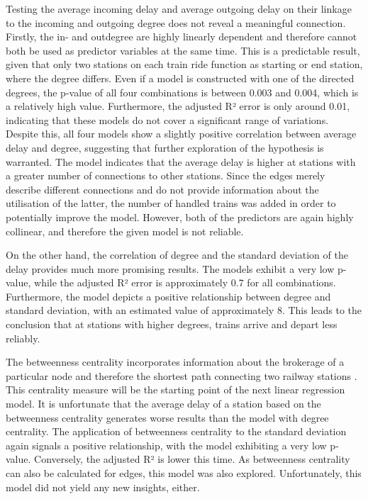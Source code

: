 \documentclass[12pt,a4paper]{article}
\begin{document}
Testing the average incoming delay and average outgoing delay on their linkage to the incoming and outgoing degree does not reveal a meaningful connection. Firstly, the in- and outdegree are highly linearly dependent and therefore cannot both be used as predictor variables at the same time. This is a predictable result, given that only two stations on each train ride function as starting or end station, where the degree differs. Even if a model is constructed with one of the directed degrees, the p-value of all four combinations is between 0.003 and 0.004, which is a relatively high value. Furthermore, the adjusted R² error is only around 0.01, indicating that these models do not cover a significant range of variations. Despite this, all four models show a slightly positive correlation between average delay and degree, suggesting that further exploration of the hypothesis is warranted. The model indicates that the average delay is higher at stations with a greater number of connections to other stations. Since the edges merely describe different connections and do not provide information about the utilisation of the latter, the number of handled trains was added in order to potentially improve the model. 
However, both of the predictors are again highly collinear, and therefore the given model is not reliable.

On the other hand, the correlation of degree and the standard deviation of the delay provides much more promising results. The models exhibit a very low p-value, while the adjusted R² error is approximately 0.7 for all combinations. Furthermore, the model depicts a positive relationship between degree and standard deviation, with an estimated value of approximately 8. This leads to the conclusion that at stations with higher degrees, trains arrive and depart less reliably. 

The betweenness centrality incorporates information about the brokerage of a particular node and therefore the shortest path connecting two railway stations \citep[p.~35]{Linton}. This centrality measure will be the starting point of the next linear regression model. It is unfortunate that the average delay of a station based on the betweenness centrality generates worse results than the model with degree centrality. The application of betweenness centrality to the standard deviation again signals a positive relationship, with the model exhibiting a very low p-value. Conversely, the adjusted R² is lower this time. As betweenness centrality can also be calculated for edges, this model was also explored. Unfortunately, this model did not yield any new insights, either. 
\end{document}
